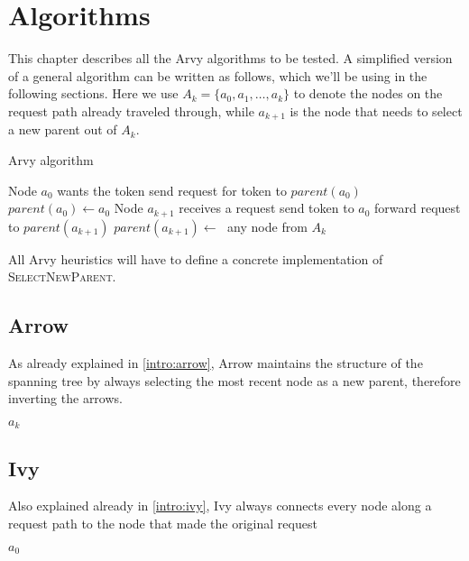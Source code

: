 \documentclass[a4paper, oneside]{discothesis}
\begin{document}
\chapter{Algorithms}\label{algs}

This chapter describes all the Arvy algorithms to be tested. A simplified version of a general algorithm can be written as follows, which we'll be using in the following sections. Here we use $A_k=\{a_0,a_1,\dots,a_k\}$ to denote the nodes on the request path already traveled through, while $a_{k+1}$ is the node that needs to select a new parent out of $A_k$.

\begin{algorithm}
\caption{Arvy algorithm}
\label{arvyalg}
\begin{algorithmic}
\Comment Node $a_{0}$ wants the token
    \State send request for token to $parent(a_{0})$
    \State $parent(a_{0})\gets a_{0}$
\EndIf
\EndFunction
{}
\Comment Node $a_{k+1}$ receives a request
    \State send token to $a_{0}$
\Else
    \State forward request to $parent(a_{k+1})$
\EndIf
\State $parent(a_{k+1})\gets\;$
\EndFunction
{}
\State\Return any node from $A_k$
\EndFunction
\end{algorithmic}
\end{algorithm}

All Arvy heuristics will have to define a concrete implementation of \textsc{SelectNewParent}.

\section{Arrow}

As already explained in \autoref{intro:arrow}, Arrow maintains the structure of the spanning tree by always selecting the most recent node as a new parent, therefore inverting the arrows.
\begin{algorithmic}
\State\Return $a_k$
\EndFunction
\end{algorithmic}

\section{Ivy}

Also explained already in \autoref{intro:ivy}, Ivy always connects every node along a request path to the node that made the original request
\begin{algorithmic}
\State\Return $a_0$
\EndFunction
\end{algorithmic}
\end{document}
